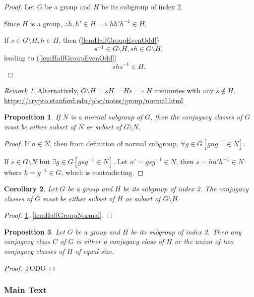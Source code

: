 \documentclass[12pt, letterpaper]{article}
\newcommand{\red}[1]{{\color{red} #1}}
\newtheorem{prop}{Proposition}[section]
\newtheorem{cor}[prop]{Corollary}
\theoremstyle{definition}
\theoremstyle{remark}
\newtheorem*{rem*}{Remark}
\theoremstyle{definition}
\theoremstyle{plain}
\numberwithin{equation}{section}
\begin{document}
	\begin{proof}
		Let $G$ be a group and $H$ be its subgroup of index 2.
		
		Since $H$ is a group, $\therefore h,h'\in H\implies hh'h^{-1}\in H$.
		
		If $s\in G\setminus H, h\in H$, then (\ref{lemHalfGroupEvenOdd})
		\[ s^{-1}\in G\setminus H, sh\in G\setminus H ,\]
		leading to (\ref{lemHalfGroupEvenOdd})
		\[ shs^{-1}\in H.\]
	\end{proof}
	\begin{rem*}
		Alternatively, $G\setminus H = sH=Hs\implies H$ commutes with any $s\notin H$.
		\url{https://crypto.stanford.edu/pbc/notes/group/normal.html}
	\end{rem*}
	\begin{prop}\label{lemNormalSubGroupConjugacy}
		If $N$ is a normal subgroup of $G$, then the conjugacy classes of $G$ must be either subset of $N$ or subset of $G\setminus N$.
	\end{prop}
	\begin{proof}
		If $n\in N$, then from definition of normal subgroup, $\forall g\in G[gng^{-1}\in N]$.
		
		If $s\in G\setminus N$ but $\exists g\in G[gsg^{-1}\in N]$.
		Let $n'=gsg^{-1}\in N$, then $s=hn'h^{-1}\in N$ where $h=g^{-1}\in G$, which is contradicting.
	\end{proof}
	\begin{cor}\label{lemHalfGroupConjugacy}
		Let $G$ be a group and $H$ be its subgroup of index 2.
		The conjugacy classes of $G$ must be either subset of $H$ or subset of $G\setminus H$.
	\end{cor}
	\begin{proof}
		\ref{lemNormalSubGroupConjugacy},
		\ref{lemHalfGroupNormal}.
	\end{proof}

	\begin{prop}
		Let $G$ be a group and $H$ be its subgroup of index 2.
		Then any conjugacy class $C$ of $G$ is either a conjugacy class of $H$
		or the union of two conjugacy classes of $H$ of equal size.
	\end{prop}
	\begin{proof}
		\red{TODO}
	\end{proof}
	\subsubsection{Main Text}
\end{document}
